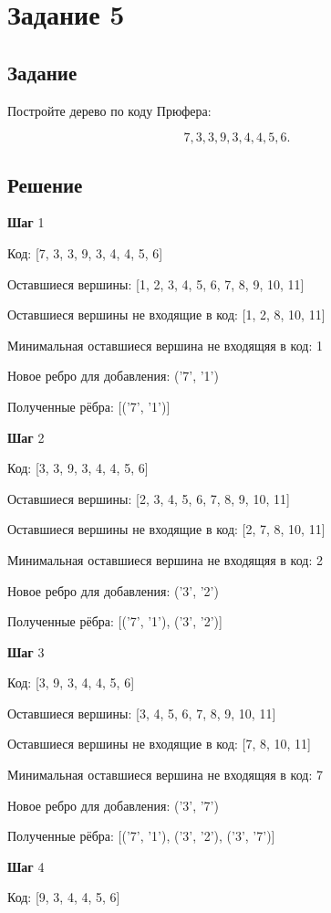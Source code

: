 \section*{Задание 5}

\subsection*{Задание}

Постройте дерево по коду Прюфера:

$$ 7, 3, 3, 9, 3, 4, 4, 5, 6. $$

\subsection*{Решение}

\textbf{Шаг} 1

Код: [7, 3, 3, 9, 3, 4, 4, 5, 6]

Оставшиеся вершины: [1, 2, 3, 4, 5, 6, 7, 8, 9, 10, 11]

Оставшиеся вершины не входящие в код: [1, 2, 8, 10, 11]

Минимальная оставшиеся вершина не входящяя в код: 1

Новое ребро для добавления: ('7', '1')

Полученные рёбра: [('7', '1')]


\textbf{Шаг} 2

Код: [3, 3, 9, 3, 4, 4, 5, 6]

Оставшиеся вершины: [2, 3, 4, 5, 6, 7, 8, 9, 10, 11]

Оставшиеся вершины не входящие в код: [2, 7, 8, 10, 11]

Минимальная оставшиеся вершина не входящяя в код: 2

Новое ребро для добавления: ('3', '2')

Полученные рёбра: [('7', '1'), ('3', '2')]


\textbf{Шаг} 3

Код: [3, 9, 3, 4, 4, 5, 6]

Оставшиеся вершины: [3, 4, 5, 6, 7, 8, 9, 10, 11]

Оставшиеся вершины не входящие в код: [7, 8, 10, 11]

Минимальная оставшиеся вершина не входящяя в код: 7

Новое ребро для добавления: ('3', '7')

Полученные рёбра: [('7', '1'), ('3', '2'), ('3', '7')]


\textbf{Шаг} 4

Код: [9, 3, 4, 4, 5, 6]

